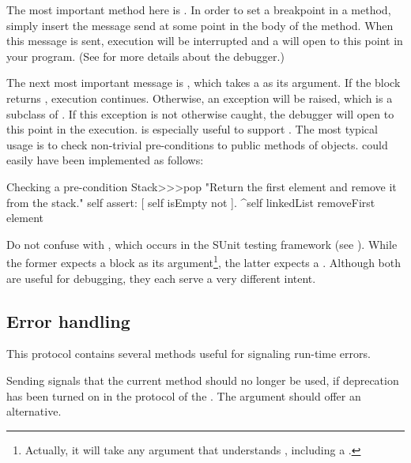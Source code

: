 \documentclass[a4paper,10pt,twoside]{book}
\begin{document}
The most important method here is .
In order to set a breakpoint in a method, simply insert the message send  at some point in the body of the method.
When this message is sent, execution will be interrupted and a  will open to this point in your program.
(See  for more details about the debugger.)


The next most important message is , which takes a  as its argument.
If the block returns , execution continues.
Otherwise, an  exception will be raised, which is a subclass of .
If this exception is not otherwise caught, the debugger will open to this point in the execution.
 is especially useful to support .
The most typical usage is to check non-trivial pre-conditions to public methods of objects.
 could easily have been implemented as follows:

\begin{method}{Checking a pre-condition}
Stack>>>pop
    "Return the first element and remove it from the stack."
    self assert: [ self isEmpty not ].
    ^self linkedList removeFirst element
\end{method}

Do not confuse  with , which occurs in the SUnit testing framework (see ).
While the former expects a block as its argument\footnote{Actually, it will take any argument that understands , including a .}, the latter expects a .
Although both are useful for debugging, they each serve a very different intent.

\subsection{Error handling}

This protocol contains several methods useful for signaling run-time errors.

Sending  signals that the current method should no longer be used, if deprecation has been turned on in the  protocol of the .
The  argument should offer an alternative.
\end{document}
